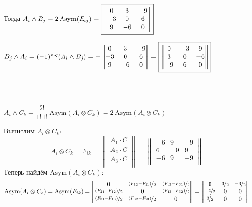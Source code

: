 \documentclass{article}
\newcommand*\squared[1]{\tikz[baseline=(char.base)]{
            \node[shape=rectangle,draw,inner sep=4pt] (char) {#1};}}
\begin{document}
Тогда $A_i \wedge B_j = 2\,\text{Asym}(E_{ij}) = \squared{$\begin{Vmatrix}
0 & 3 & -9 \\
-3 & 0 & 6 \\
9 & -6 & 0
\end{Vmatrix}$}$
\, \\
\begin{center}
$B_j \wedge A_i = (-1)^{p\cdot q}(A_i \wedge B_j) = - \begin{Vmatrix}
0 & 3 & -9 \\
-3 & 0 & 6 \\
9 & -6 & 0
\end{Vmatrix} = \squared{$\begin{Vmatrix}
0 & -3 & 9 \\
3 & 0 & -6 \\
-9 & 6 & 0
\end{Vmatrix}$}$
\end{center}
\, \\ \, \\
\begin{center}
$A_i \wedge C_k = \dfrac{2!}{1!\,1!}\,\text{Asym}(A_i\otimes C_k) = 2\,\text{Asym}(A_i\otimes C_k)$
\end{center}
Вычислим $A_i\otimes C_k$:
$$A_i\otimes C_k = F_{ik} = \begin{Vmatrix}
A_1 \cdot C \\
A_2 \cdot C \\
A_3 \cdot C \\
\end{Vmatrix} = \begin{Vmatrix}
-6 & 9 & -9 \\
6 & -9 & 9 \\
-6 & 9 & -9 \\
\end{Vmatrix}$$
Теперь найдём $\text{Asym}(A_i\otimes C_k)$:
$$\text{Asym}(A_i\otimes C_k) = \text{Asym}(F_{ik}) = \begin{Vmatrix}
0 & \nicefrac{(F_{12} - F_{21})}{2} & \nicefrac{(F_{13} - F_{31})}{2} \\
\nicefrac{(F_{21} - F_{12})}{2} & 0 & \nicefrac{(F_{23} - F_{32})}{2} \\
\nicefrac{(F_{31} - F_{13})}{2} & \nicefrac{(F_{32} - F_{23})}{2} & 0
\end{Vmatrix} = \begin{Vmatrix}
0 & \nicefrac{3}{2} & \nicefrac{-3}{2} \\
\nicefrac{-3}{2} & 0 & 0 \\
\nicefrac{3}{2} & 0 & 0
\end{Vmatrix}$$
\end{document}
